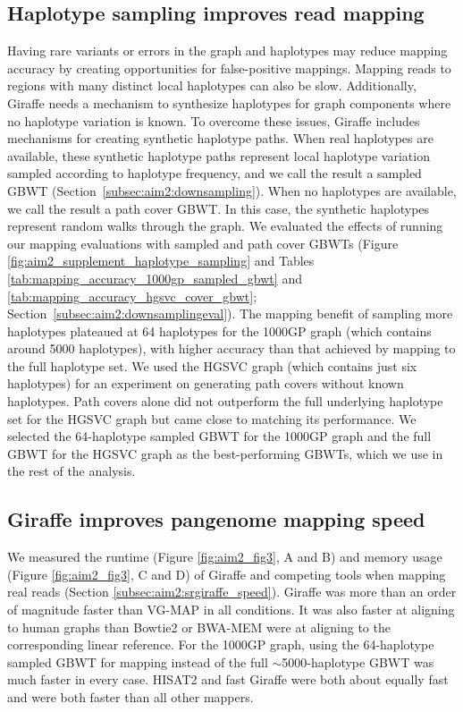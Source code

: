 \documentclass[11pt]{ucscthesis}
\begin{document}
\subsection{Haplotype sampling improves read mapping}
Having rare variants or errors in the graph and haplotypes may reduce mapping accuracy by creating opportunities for false-positive mappings\cite{Pritt2018}.
Mapping reads to regions with many distinct local haplotypes can also be slow.
Additionally, Giraffe needs a mechanism to synthesize haplotypes for graph components where no haplotype variation is known.
To overcome these issues, Giraffe includes mechanisms for creating synthetic haplotype paths.
When real haplotypes are available, these synthetic haplotype paths represent local haplotype variation sampled according to haplotype frequency, and we call the result a sampled GBWT (Section~\ref{subsec:aim2:downsampling}).
When no haplotypes are available, we call the result a path cover GBWT.
In this case, the synthetic haplotypes represent random walks through the graph. We evaluated the effects of running our mapping evaluations with sampled and path cover GBWTs (Figure \ref{fig:aim2_supplement_haplotype_sampling} and Tables \ref{tab:mapping_accuracy_1000gp_sampled_gbwt} and \ref{tab:mapping_accuracy_hgsvc_cover_gbwt}; Section~\ref{subsec:aim2:downsamplingeval}).
The mapping benefit of sampling more haplotypes plateaued at 64 haplotypes for the 1000GP graph (which contains around 5000 haplotypes), with higher accuracy than that achieved by mapping to the full haplotype set.
We used the HGSVC graph (which contains just six haplotypes) for an experiment on generating path covers without known haplotypes.
Path covers alone did not outperform the full underlying haplotype set for the HGSVC graph but came close to matching its performance.
We selected the 64-haplotype sampled GBWT for the 1000GP graph and the full GBWT for the HGSVC graph as the best-performing GBWTs, which we use in the rest of the analysis.

\subsection{Giraffe improves pangenome mapping speed}
We measured the runtime (Figure \ref{fig:aim2_fig3}, A and B) and memory usage (Figure \ref{fig:aim2_fig3}, C and D) of Giraffe and competing tools when mapping real reads (Section \ref{subsec:aim2:srgiraffe_speed}).
Giraffe was more than an order of magnitude faster than VG-MAP in all conditions.
It was also faster at aligning to human graphs than Bowtie2 or BWA-MEM were at aligning to the corresponding linear reference.
For the 1000GP graph, using the 64-haplotype sampled GBWT for mapping instead of the full $\sim$5000-haplotype GBWT was much faster in every case.
HISAT2 and fast Giraffe were both about equally fast and were both faster than all other mappers.
\end{document}
